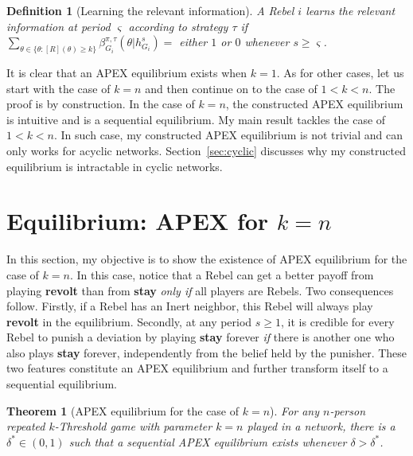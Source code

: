 \documentclass[12pt,letter]{article}
\newtheorem{theorem}{Theorem}
\newtheorem{definition}{Definition}[section]
\theoremstyle{definition}
\theoremstyle{remark}
\theoremstyle{claim}
\begin{document}
\begin{definition}[Learning the relevant information]\label{def_learn}
A Rebel $i$ learns the relevant information at period $\varsigma$ according to strategy $\tau$ if $\sum_{\theta\in\{\theta:[R](\theta)\geq k\}}\beta^{\pi,\tau}_{G_i}(\theta|h^{s}_{G_i})=$ either $1$ or $0$ whenever $s\geq \varsigma$.
\end{definition}

It is clear that an APEX equilibrium exists when $k=1$. As for other cases, let us start with the case of $k=n$ and then continue on to the case of $1<k<n$. The proof is by construction. In the case of $k=n$, the constructed APEX equilibrium is intuitive and is a sequential equilibrium. My main result tackles the case of $1<k<n$. In such case, my constructed APEX equilibrium is not trivial and can only works for acyclic networks. Section~\ref{sec:cyclic} discusses why my constructed equilibrium is intractable in cyclic networks.

\section{Equilibrium: APEX for $k=n$}
\label{sec:equilibrium_1}

In this section, my objective is to show the existence of APEX equilibrium for the case of $k=n$. In this case, notice that a Rebel can get a better payoff from playing \textbf{revolt} than from \textbf{stay} \textit{only if} all players are Rebels. Two consequences follow. Firstly, if a Rebel has an Inert neighbor, this Rebel will always play \textbf{revolt} in the equilibrium. Secondly, at any period $s\geq 1$, it is credible for every Rebel to punish a deviation by playing \textbf{stay} forever \textit{if} there is another one who also plays \textbf{stay} forever, independently from the belief held by the punisher. These two features constitute an APEX equilibrium and further transform itself to a sequential equilibrium. 

\begin{theorem}[APEX equilibrium for the case of $k=n$]
\label{thm_minor_thm}
For any $n$-person repeated $k$-Threshold game with parameter $k=n$ played in a network, there is a $\delta^{*}\in(0,1)$ such that a sequential APEX equilibrium exists whenever $\delta >
\delta^{*}$.
\end{theorem}
\end{document}
